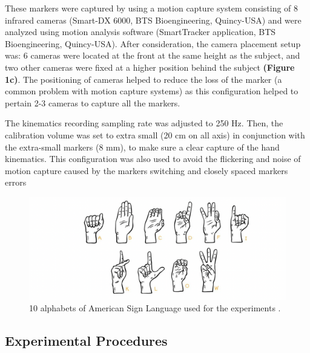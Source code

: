 \documentclass[conference]{IEEEtran}
\begin{document}
These markers were captured by using a motion capture system consisting of 8 infrared cameras (Smart-DX 6000, BTS Bioengineering, Quincy-USA) and were analyzed using motion analysis software
(SmartTracker application, BTS Bioengineering, Quincy-USA). After consideration, the camera placement 
setup was: 6 cameras were located at the front at the same height as the subject, and two other cameras 
were fixed at a higher position behind the subject \textbf{(Figure 1c)}. The positioning of cameras helped to reduce 
the loss of the marker (a common problem with motion capture systems) as this configuration helped 
to pertain 2-3 cameras to capture all the markers.

The kinematics recording sampling rate was adjusted to 250 Hz. Then, the calibration volume was set 
to extra small (20 cm on all axis) in conjunction with the extra-small markers (8 mm), to make sure a clear 
capture of the hand kinematics. This configuration was also used to avoid the flickering and noise of motion 
capture caused by the markers switching and closely spaced markers errors

\begin{figure}[htbp]
\centerline{\includegraphics[width=\columnwidth]{figure2.png}}
\caption{10 alphabets of American Sign Language used for the experiments \cite{b26}.}
\label{figure2}
\end{figure}

\subsection{Experimental Procedures}
\end{document}
